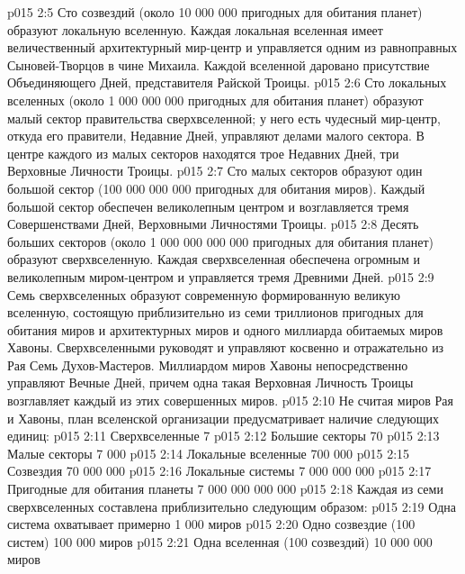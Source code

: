 \vs p015 2:5 \pc {}\bibnobreakspace {} Сто созвездий (около 10 000 000 пригодных для обитания планет) образуют локальную вселенную. Каждая локальная вселенная имеет величественный архитектурный мир\hyp{}центр и управляется одним из равноправных Сыновей\hyp{}Творцов в чине Михаила. Каждой вселенной даровано присутствие Объединяющего Дней, представителя Райской Троицы.
\vs p015 2:6 \pc {}\bibnobreakspace {} Сто локальных вселенных (около 1 000 000 000 пригодных для обитания планет) образуют малый сектор правительства сверхвселенной; у него есть чудесный мир\hyp{}центр, откуда его правители, Недавние Дней, управляют делами малого сектора. В центре каждого из малых секторов находятся трое Недавних Дней, три Верховные Личности Троицы.
\vs p015 2:7 \pc {}\bibnobreakspace {} Сто малых секторов образуют один большой сектор (100 000 000 000 пригодных для обитания миров). Каждый большой сектор обеспечен великолепным центром и возглавляется тремя Совершенствами Дней, Верховными Личностями Троицы.
\vs p015 2:8 \pc {}\bibnobreakspace {} Десять больших секторов (около 1 000 000 000 000 пригодных для обитания планет) образуют сверхвселенную. Каждая сверхвселенная обеспечена огромным и великолепным миром\hyp{}центром и управляется тремя Древними Дней.
\vs p015 2:9 \pc {}\bibnobreakspace {} Семь сверхвселенных образуют современную формированную великую вселенную, состоящую приблизительно из семи триллионов пригодных для обитания миров и архитектурных миров и одного миллиарда обитаемых миров Хавоны. Сверхвселенными руководят и управляют косвенно и отражательно из Рая Семь Духов\hyp{}Мастеров. Миллиардом миров Хавоны непосредственно управляют Вечные Дней, причем одна такая Верховная Личность Троицы возглавляет каждый из этих совершенных миров.
\vs p015 2:10 \pc Не считая миров Рая и Хавоны, план вселенской организации предусматривает наличие следующих единиц:
\vs p015 2:11 Сверхвселенные 7
\vs p015 2:12 Большие секторы 70
\vs p015 2:13 Малые секторы 7 000
\vs p015 2:14 Локальные вселенные 700 000
\vs p015 2:15 Созвездия 70 000 000
\vs p015 2:16 Локальные системы 7 000 000 000
\vs p015 2:17 \pc Пригодные для обитания планеты 7 000 000 000 000
\vs p015 2:18 Каждая из семи сверхвселенных составлена приблизительно следующим образом:
\vs p015 2:19 Одна система охватывает примерно 1 000 миров
\vs p015 2:20 Одно созвездие (100 систем) 100 000 миров
\vs p015 2:21 Одна вселенная (100 созвездий) 10 000 000 миров

